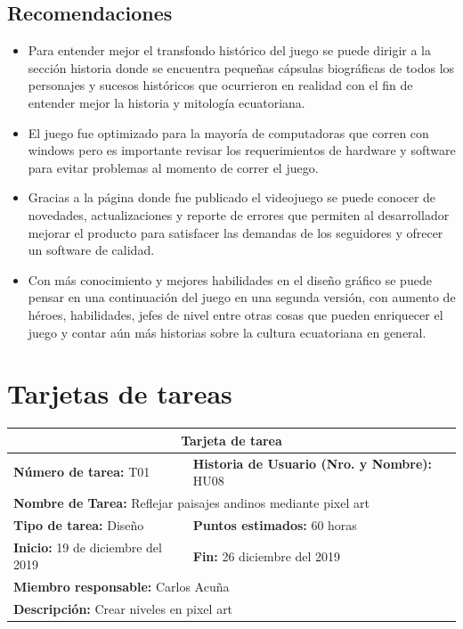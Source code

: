 \documentclass[a4paper, openright, 12pt]{report}
\begin{document}
\section{Recomendaciones}
\begin{itemize}
\item Para entender mejor el transfondo histórico del juego se puede dirigir a la sección historia donde se encuentra pequeñas cápsulas biográficas de todos los personajes y sucesos históricos que ocurrieron en realidad con el fin de entender mejor la historia y mitología ecuatoriana.

\item El juego fue optimizado para la mayoría de computadoras que corren con windows pero es importante revisar los requerimientos de hardware y software para evitar problemas al momento de correr el juego.

\item Gracias a la página donde fue publicado el videojuego se puede conocer de novedades, actualizaciones y reporte de errores que permiten al desarrollador mejorar el producto para satisfacer las demandas de los seguidores y ofrecer un software de calidad.

\item Con más conocimiento y mejores habilidades en el diseño gráfico se puede pensar en una continuación del juego en una segunda versión, con aumento de héroes, habilidades, jefes de nivel entre otras cosas que pueden enriquecer el juego y contar aún más historias sobre la cultura ecuatoriana en general.
\end{itemize}
\clearpage
 
{}

\clearpage
\appendix
\pagestyle{empty}
\chapter{Tarjetas de tareas}\label{aped.A}

\begin{longtable}{| p{6cm} | p{6cm} |}
\hline
\multicolumn{2}{|c|}{\textbf{Tarjeta de tarea}} \\
\hline
\textbf{Número de tarea:} T01 & \textbf{Historia de Usuario (Nro. y Nombre):} HU08\\
\hline
\multicolumn{2}{|p{12cm}|}{\textbf{Nombre de Tarea:} Reflejar paisajes andinos mediante pixel art} \\ \hline
\textbf{Tipo de tarea:} Diseño & \textbf{Puntos estimados:} 60 horas  \\ \hline
\textbf{Inicio:} 19 de diciembre del 2019 & \textbf{Fin:} 26 diciembre del 2019 \\ \hline
\multicolumn{2}{|p{12cm}|}{\textbf{Miembro responsable:} Carlos Acuña} \\ \hline
\multicolumn{2}{|p{12cm}|}{\textbf{Descripción:} Crear niveles en pixel art} \\ \hline
\end{longtable}
\end{document}

